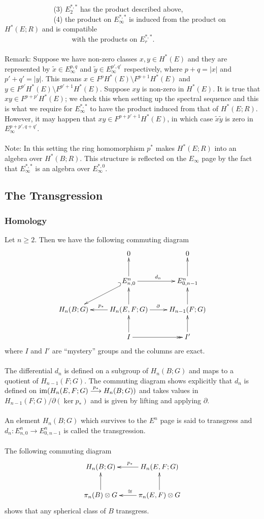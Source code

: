 \documentclass[11pt]{article}
\begin{document}
\begin{Jandr SSS notes}
$\phantom{poopoopoopoopo}$(3) $E_2^{*,*}$ has the product described above,\\
$\phantom{poopoopoopoopo}$(4) the product on $E_{\infty}^{*,*}$ is induced from the product on $H^*(E;R)$ and is compatible\\
$\phantom{poopoopoopoopo(4)}$ with the products on $E_r^{*,*}$.\\
\\
Remark: Suppose we have non-zero classes $x,y\in H^*(E)$ and they are represented by $\tilde{x}\in E_{\infty}^{p,q}$ and $\tilde{y}\in E_{\infty}^{p',q'}$ respectively, where $p+q=|x|$ and $p'+q'=|y|$. This means $x\in F^p H^*(E)\setminus F^{p+1}H^*(E)$ and $y\in F^{p'}H^*(E)\setminus F^{p'+1}H^*(E)$. Suppose $xy$ is non-zero in $H^*(E)$. It is true that $xy\in F^{p+p'}H^*(E)$; we check this when setting up the spectral sequence and this is what we require for $E_{\infty}^{*,*}$ to have the product induced from that of $H^*(E;R)$. However, it may happen that $xy\in F^{p+p'+1}H^*(E)$, in which case $\tilde{x}\tilde{y}$ is zero in $E_{\infty}^{p+p',q+q'}$.\\
\\
Note: In this setting the ring homomorphism $p^*$ makes $H^*(E;R)$ into an algebra over $H^*(B;R)$. This structure is reflected on the $E_{\infty}$ page by the fact that $E_{\infty}^{*,*}$ is an algebra over $E_{\infty}^{*,0}$.


	\subsection{The Transgression}
	\subsubsection{Homology}
Let $n\geq 2$. Then we have the following commuting diagram
\[\xymatrix{&0&0\\
&E^n_{n,0} \ar[r]^{d_n} \ar[u] \ar@{_{(}->}[dl] & E^n_{0,n-1} \ar[u]\\
H_n(B;G) & H_n(E,F;G)\ar[l]_{p_*}\ar[r]^{\partial}\ar[u] & H_{n-1}(F;G)\ar[u]\\
&I \ar[u] \ar@{->>}[r] & I' \ar[u]}\]
where $I$ and $I'$ are ``mystery'' groups and the columns are exact.\\
\\
The differential $d_n$ is defined on a subgroup of $H_n(B;G)$ and maps to a quotient of $H_{n-1}(F;G)$. The commuting diagram shows explicitly that $d_n$ is defined on $\operatorname{im}(H_n(E,F;G)\overset{p_*}{\longrightarrow} H_n(B;G))$ and takes values in $H_{n-1}(F;G)/\partial(\ker p_*)$ and is given by lifting and applying $\partial$.\\
\\
An element $H_n(B;G)$ which survives to the $E^n$ page is said to transgress and $d_n:E^n_{n,0}\to E^n_{0,n-1}$ is called the transgression.\\
\\
The following commuting diagram
\[\xymatrix{H_n(B;G) & H_n(E,F;G)\ar[l]_{p_*}\\
\pi_n(B)\otimes G\ar[u]&\pi_n(E,F)\otimes G\ar[l]_{\cong}\ar[u]}\]
shows that any spherical class of $B$ transgress.



\end{Jandr SSS notes}
\end{document}
